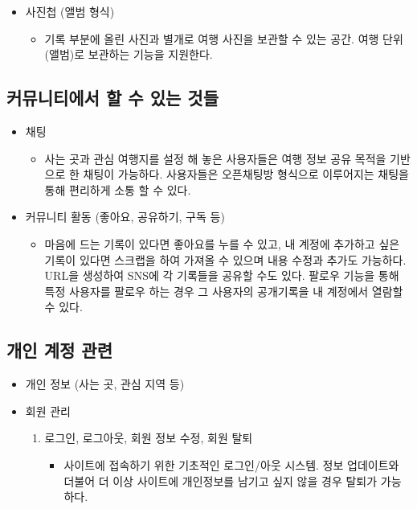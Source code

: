 \begin{itemize}
    \item 사진첩 (앨범 형식)
        \begin{itemize}
            \item [] 기록 부분에 올린 사진과 별개로 여행 사진을 보관할 수 있는 공간. 여행 단위(앨범)로 보관하는 기능을 지원한다.
        \end{itemize}
\end{itemize}

\subsection{커뮤니티에서 할 수 있는 것들}

\begin{itemize}
    \item 채팅
    \begin{itemize}
        \item [] 사는 곳과 관심 여행지를 설정 해 놓은 사용자들은 여행 정보 공유 목적을 기반으로 한 채팅이 가능하다. 사용자들은 오픈채팅방 형식으로 이루어지는 채팅을 통해 편리하게 소통 할 수 있다.
    \end{itemize}
\end{itemize}

\begin{itemize}
    \item 커뮤니티 활동 (좋아요, 공유하기, 구독 등)
    \begin{itemize}
        \item [] 마음에 드는 기록이 있다면 좋아요를 누를 수 있고, 내 계정에 추가하고 싶은 기록이 있다면 스크랩을 하여 가져올 수 있으며 내용 수정과 추가도 가능하다. URL을 생성하여 SNS에 각 기록들을 공유할 수도 있다. 팔로우 기능을 통해 특정 사용자를 팔로우 하는 경우 그 사용자의 공개기록을 내 계정에서 열람할 수 있다.
    \end{itemize}
\end{itemize}

\subsection{개인 계정 관련}

\begin{itemize}
    \item 개인 정보 (사는 곳, 관심 지역 등) 
\end{itemize}

\begin{itemize}
    \item 회원 관리
    \begin{enumerate}
        \item 로그인, 로그아웃, 회원 정보 수정, 회원 탈퇴
        \begin{itemize}
            \item[] 사이트에 접속하기 위한 기초적인 로그인/아웃 시스템. 정보 업데이트와 더불어 더 이상 사이트에 개인정보를 남기고 싶지 않을 경우 탈퇴가 가능하다.
        \end{itemize}
    \end{enumerate}
\end{itemize}
\par\

